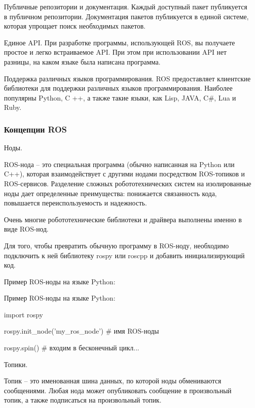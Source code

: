 Публичные репозитории и документация. Каждый доступный пакет публикуется в публичном репозитории. Документация пакетов публикуется в единой системе, которая упрощает поиск необходимых пакетов.

Единое API. При разработке программы, использующей ROS, вы получаете простое и легко встраиваемое API. При этом при использовании API нет разницы, на каком языке была написана программа.

Поддержка различных языков программирования. ROS предоставляет клиентские библиотеки для поддержки различных языков программирования. Наиболее популярны Python, C ++, а также такие языки, как Lisp, JAVA, C\#, Lua и Ruby.
\cite{voltbro}


\subsubsection{Концепции ROS}
Ноды.

ROS-нода – это специальная программа (обычно написанная на Python или C++), которая взаимодействует с другими нодами посредством ROS-топиков и ROS-сервисов. Разделение сложных робототехнических систем на изолированные ноды дает определенные преимущества: понижается связанность кода, повышается переиспользуемость и надежность.

Очень многие робототехнические библиотеки и драйвера выполнены именно в виде ROS-нод.

Для того, чтобы превратить обычную программу в ROS-ноду, необходимо подключить к ней библиотеку rospy или roscpp и добавить инициализирующий код.

Пример ROS-ноды на языке Python:

\begin{Program}[H]
	\caption{Пример ROS-ноды на языке Python:} \label{lst:1}
	\begin{MyCode}
import rospy

rospy.init\_node('my\_ros\_node')  # имя ROS-ноды

rospy.spin()  # входим в бесконечный цикл...
	\end{MyCode}
\end{Program}
Топики.

Топик – это именованная шина данных, по которой ноды обмениваются сообщениями. Любая нода может опубликовать сообщение в произвольный топик, а также подписаться на произвольный топик.


